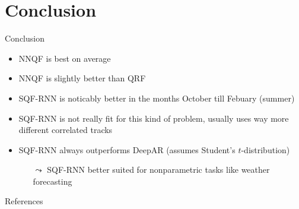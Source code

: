 \documentclass[10pt,aspectratio=169]{beamer}
\begin{document}
\section{Conclusion}

\begin{frame}{Conclusion}
    \begin{itemize}
        \item NNQF is best on average
        \item NNQF is slightly better than QRF
        \item SQF-RNN is noticably better in the months October till Febuary (summer)
        \item SQF-RNN is not really fit for this kind of problem, usually uses way more different correlated tracks
        \item SQF-RNN always outperforms DeepAR (assumes Student's \(t\)-distribution)
        \begin{itemize}
            \item[\(\leadsto\)] SQF-RNN better suited for nonparametric tasks like weather forecasting
        \end{itemize}
    \end{itemize}
\end{frame}

\begin{frame}{References}
    \printbibliography[heading=none]
\end{frame}
\end{document}
